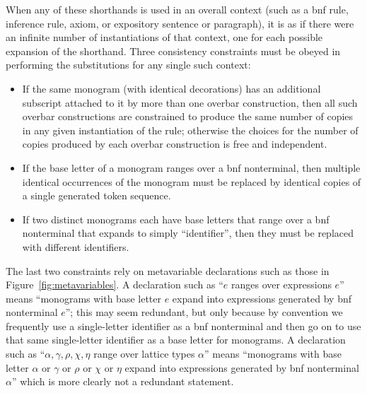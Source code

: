 When any of these shorthands is used in an overall context (such as a {\sc bnf} rule, inference rule, axiom, or expository sentence or paragraph), it is as if there were an infinite number of instantiations of that context, one for each possible expansion of the shorthand.  Three consistency constraints must be obeyed in performing the substitutions for any single such context:
\begin{itemize}
\item
If the same monogram (with identical decorations) has an additional subscript attached to it
by more than one overbar construction, then all such overbar constructions are constrained to produce the same number of copies in any given instantiation of the rule;
otherwise the choices for the number of copies produced by each overbar construction is free and independent.
\item
If the base letter of a monogram ranges over a {\sc bnf} nonterminal, then multiple identical occurrences of the monogram must be replaced by identical copies of a single generated token sequence.
\item
If two distinct monograms each have base letters that range over a {\sc bnf} nonterminal that expands to simply ``identifier'', then they must be replaced with different identifiers.
\end{itemize}
The last two constraints rely on metavariable declarations such as those in Figure~\ref{fig:metavariables}.  A declaration such as
``$e$ ranges over expressions $e$'' means 
``monograms with base letter $e$ expand into expressions generated by {\sc bnf} nonterminal $e$'';
this may seem redundant, but only because by convention we frequently use a single-letter identifier as a {\sc bnf} nonterminal
and then go on to use that same single-letter identifier as a base letter for monograms.
A declaration such as
``$\alpha, \gamma, \rho, \chi, \eta$ range over lattice types $\alpha$'' means 
``monograms with base letter $\alpha$ or $\gamma$ or $\rho$ or $\chi$ or $\eta$ expand into expressions generated by {\sc bnf} nonterminal $\alpha$''
which is more clearly not a redundant statement.

